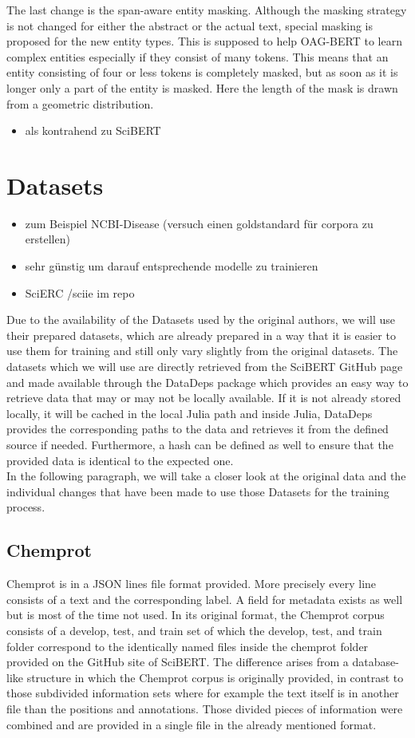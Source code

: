 	The last change is the span-aware entity masking. Although the masking strategy is not changed for either the abstract or the actual text, special masking is proposed for the new entity types. This is supposed to help OAG-BERT to learn complex entities especially if they consist of many tokens. This means that an entity consisting of four or less tokens is completely masked, but as soon as it is longer only a part of the entity is masked. Here the length of the mask is drawn from a geometric distribution.   
\begin{itemize}
	\item als kontrahend zu SciBERT \cite{Liu2021}
\end{itemize}
\color{ForestGreen}
\section{Datasets}
\begin{itemize}
	\item zum Beispiel NCBI-Disease (versuch einen goldstandard für corpora zu erstellen)
	\item sehr günstig um darauf entsprechende modelle zu trainieren \cite{Dogan2014}
	\item SciERC /sciie im repo \cite{luan2018multitask}
\end{itemize}
\color{black}
Due to the availability of the Datasets used by the original authors, we will use their prepared datasets, which are already prepared in a way that it is easier to use them for training and still only vary slightly from the original datasets. The datasets which we will use are directly retrieved from the SciBERT GitHub page and made available through the DataDeps package which provides an easy way to retrieve data that may or may not be locally available. If it is not already stored locally, it will be cached in the local Julia path and inside Julia, DataDeps provides the corresponding paths to the data and retrieves it from the defined source if needed. Furthermore, a hash can be defined as well to ensure that the provided data is identical to the expected one.\cite{White2019}\\
In the following paragraph, we will take a closer look at the original data and the individual changes that have been made to use those Datasets for the training process.
\subsection{Chemprot}
Chemprot is in a JSON lines file format provided. More precisely every line consists of a text and the corresponding label. A field for metadata exists as well but is most of the time not used. In its original format, the Chemprot corpus consists of a develop, test, and train set of which the develop, test, and train folder correspond to the identically named files inside the chemprot folder provided on the GitHub site of SciBERT. The difference arises from a database-like structure in which the Chemprot corpus is originally provided, in contrast to those subdivided information sets where for example the text itself is in another file than the positions and annotations. Those divided pieces of information were combined and are provided in a single file in the already mentioned format. \cite{Beltagy2019,Wang2016}